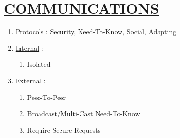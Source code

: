 \documentclass[11pt]{article}
\begin{document}
\section*{\ul{COMMUNICATIONS}}
\begin{enumerate}
	\item[] \ul{Protocols} : Security, Need-To-Know, Social, Adapting
	
	\item[] \ul{Internal} :
	\begin{enumerate}
		\item[] Isolated
	\end{enumerate}

	\item[] \ul{External} :
	\begin{enumerate}
		\item[] Peer-To-Peer
		\item[] Broadcast/Multi-Cast Need-To-Know
		\item[] Require Secure Requests
	\end{enumerate}

\end{enumerate}
\end{document}
